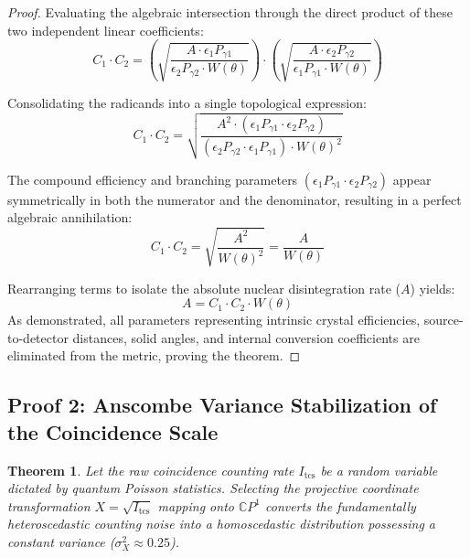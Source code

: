 \documentclass[review]{elsarticle} %
\newtheorem{theorem}{Theorem}
\begin{document}
\begin{proof}
Evaluating the algebraic intersection through the direct product of these two independent linear coefficients:
\begin{equation}
    C_1 \cdot C_2 = \left( \sqrt{\frac{A \cdot \epsilon_1 P_{\gamma 1}}{\epsilon_2 P_{\gamma 2} \cdot W(\theta)}} \right) \cdot \left( \sqrt{\frac{A \cdot \epsilon_2 P_{\gamma 2}}{\epsilon_1 P_{\gamma 1} \cdot W(\theta)}} \right)
\end{equation}

Consolidating the radicands into a single topological expression:
\begin{equation}
    C_1 \cdot C_2 = \sqrt{ \frac{A^2 \cdot (\epsilon_1 P_{\gamma 1} \cdot \epsilon_2 P_{\gamma 2})}{(\epsilon_2 P_{\gamma 2} \cdot \epsilon_1 P_{\gamma 1}) \cdot W(\theta)^2} }
\end{equation}

The compound efficiency and branching parameters $(\epsilon_1 P_{\gamma 1} \cdot \epsilon_2 P_{\gamma 2})$ appear symmetrically in both the numerator and the denominator, resulting in a perfect algebraic annihilation:
\begin{equation}
    C_1 \cdot C_2 = \sqrt{\frac{A^2}{W(\theta)^2}} = \frac{A}{W(\theta)}
\end{equation}

Rearranging terms to isolate the absolute nuclear disintegration rate ($A$) yields:
\begin{equation}
    A = C_1 \cdot C_2 \cdot W(\theta)
\end{equation}
As demonstrated, all parameters representing intrinsic crystal efficiencies, source-to-detector distances, solid angles, and internal conversion coefficients are eliminated from the metric, proving the theorem.
\end{proof}

\subsection{Proof 2: Anscombe Variance Stabilization of the Coincidence Scale}

\begin{theorem}\label{thm:anscombe}
Let the raw coincidence counting rate $I_{\text{tcs}}$ be a random variable dictated by quantum Poisson statistics. Selecting the projective coordinate transformation $X = \sqrt{I_{\text{tcs}}}$ mapping onto $\mathbb{C}P^1$ converts the fundamentally heteroscedastic counting noise into a homoscedastic distribution possessing a constant variance ($\sigma^2_X \approx 0.25$).
\end{theorem}
\end{document}
